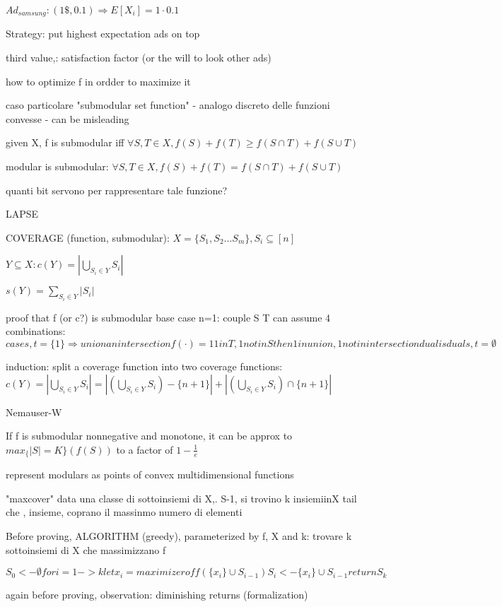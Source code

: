 \documentclass{report}
\begin{document}
	$Ad_{samsung} : (1\$, 0.1) \Rightarrow E[X_i] = 1 \cdot 0.1$
	
	Strategy: put highest expectation ads on top
	
	third value,: satisfaction factor (or the will to look other ads)
	
	how to optimize f in ordder to maximize it
	
	caso particolare "submodular set function" - analogo discreto delle funzioni convesse - can be misleading
	
	given X, f is submodular iff $\forall S, T \in X, f(S)+f(T) \geq f(S\cap T) + f(S\cup T)$
	
	modular is submodular: $\forall S, T \in X, f(S)+f(T) = f(S\cap T) + f(S\cup T)$

	quanti bit servono per rappresentare tale funzione?
	
	LAPSE
	
	COVERAGE (function, submodular): $X=\{S_1, S_2...S_m\}, S_i \subseteq [n]$
	
	$Y\subseteq X : c(Y) = |\bigcup_{S_i \in Y}S_i|$
	
	
	$s(Y) = \sum_{S_i \in Y} |S_i|$
	
	
	proof that f (or c?) is submodular
	base case n=1: couple S T can assume 4 combinations: $
	case s, t = \{1\} \Rightarrow union an intersection f(\cdot)= 1	
	1 in T, 1 not in S then 1 in union, 1 not in intersection
	dual is dual
	s, t = \emptyset
	$
	
	induction: split a coverage function into two coverage functions: $c(Y) = |\bigcup_{S_i \in Y}S_i| = |(\bigcup_{S_i \in Y}S_i)-\{n+1\}| + |(\bigcup_{S_i \in Y}S_i) \cap \{n+1\}|$
	
	Nemauser-W
	
	If f is submodular nonnegative and monotone, it can be approx to $max_\{|S|=K\}(f(S))$ to a factor of $1- \frac{1}{e}$
	
	represent modulars as points of convex multidimensional functions
	
	
	"maxcover" data una classe di sottoinsiemi di X,. S-1, si trovino k insiemiinX tail che , insieme, coprano il massinmo numero di elementi
	
	
	Before proving, ALGORITHM (greedy), parameterized by f, X and k: trovare k sottoinsiemi di X che massimizzano f
	
	$
	S_0 <- \emptyset
	for i=1 -> k
		let x_i = maximizer of f(\{x_i\} \cup S_{i-1})
		S_i <- \{x_i\} \cup S_{i-1}		
	return S_k
	$
	
	again before proving, observation: diminishing returns (formalization)
	
\end{document}
